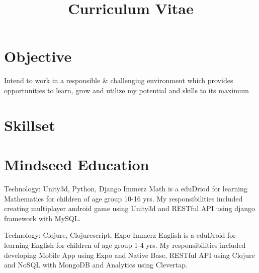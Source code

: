 \documentclass[11pt,a4paper,sans]{moderncv} %
\title{Curriculum Vitae}
\begin{document}
\makecvtitle %


\section{Objective}

Intend to work in a responsible \& challenging environment which provides opportunities to learn, grow and utilize my potential and skills to its maximum

\section{Skillset}




\section{Mindseed Education}

{Technology: Unity3d, Python, Django}{}{}
{Immerz Math is a eduDriod for learning Mathematics for children of age group 10-16 yrs. My responsibilities included creating multiplayer android game using Unity3d and RESTful API using django framework with MySQL.}

{Technology: Clojure, Clojurescript, Expo}{}{}
{Immerz English is a eduDroid for learning English for children of age group 1-4 yrs. My responsibilities included developing Mobile App using Expo and Native Base, RESTful API using Clojure and NoSQL with MongoDB and Analytics using Clevertap.}


\end{document}
